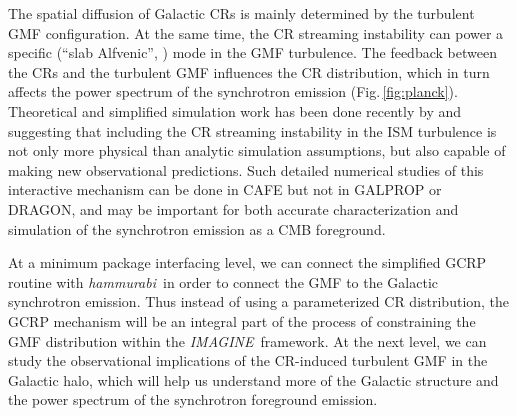 \documentclass[12pt]{article}
\newcommand{\imagine}{\textsl{IMAGINE}}
\newcommand{\hammurabi}{\textsl{hammurabi}}
\newcommand{\todo}[1]{\textcolor{red}{#1}}
\begin{document}

The spatial diffusion of Galactic CRs is mainly determined by the turbulent GMF configuration. 
At the same time, the CR streaming instability can power a specific (``slab Alfvenic'', \citealt{Lazarian2006}) mode in the GMF turbulence.
The feedback between the CRs and the turbulent GMF influences the CR distribution, which in turn affects the power spectrum of the synchrotron emission (Fig.\,\ref{fig:planck}).
Theoretical and simplified simulation work has been done recently by \cite{Blasi2012} and \cite{Evoli2018} suggesting that including the CR streaming instability in the ISM turbulence is not only more physical than analytic simulation assumptions, but also capable of making new observational predictions.  Such detailed numerical studies of this interactive mechanism can be done in CAFE but not in GALPROP or DRAGON, and may be important for both accurate characterization and simulation of the synchrotron emission as a CMB foreground. 

At a minimum package interfacing level, we can connect the simplified GCRP routine with \hammurabi\ in order to connect the GMF to the Galactic synchrotron emission.
Thus instead of using a parameterized CR distribution, the GCRP mechanism will be an integral part of the process of constraining the GMF distribution within the \imagine\ framework.  At the next level, we can study the observational implications of the CR-induced turbulent GMF in the Galactic halo, which will help us understand more of the Galactic structure and the power spectrum of the synchrotron foreground emission.
\end{document}
